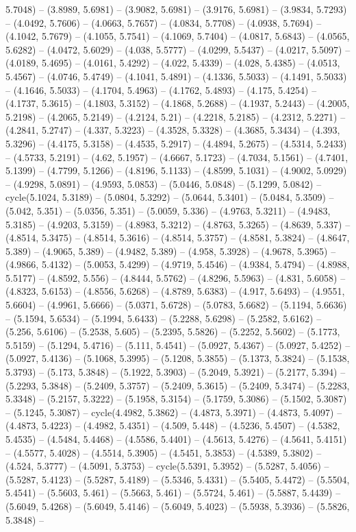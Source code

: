 5.7048) -- (3.8989, 5.6981) -- (3.9082, 5.6981) -- (3.9176, 5.6981) -- (3.9834, 5.7293) -- (4.0492, 5.7606) -- (4.0663, 5.7657) -- (4.0834, 5.7708) -- (4.0938, 5.7694) -- (4.1042, 5.7679) -- (4.1055, 5.7541) -- (4.1069, 5.7404) -- (4.0817, 5.6843) -- (4.0565, 5.6282) -- (4.0472, 5.6029) -- (4.038, 5.5777) -- (4.0299, 5.5437) -- (4.0217, 5.5097) -- (4.0189, 5.4695) -- (4.0161, 5.4292) -- (4.022, 5.4339) -- (4.028, 5.4385) -- (4.0513, 5.4567) -- (4.0746, 5.4749) -- (4.1041, 5.4891) -- (4.1336, 5.5033) -- (4.1491, 5.5033) -- (4.1646, 5.5033) -- (4.1704, 5.4963) -- (4.1762, 5.4893) -- (4.175, 5.4254) -- (4.1737, 5.3615) -- (4.1803, 5.3152) -- (4.1868, 5.2688) -- (4.1937, 5.2443) -- (4.2005, 5.2198) -- (4.2065, 5.2149) -- (4.2124, 5.21) -- (4.2218, 5.2185) -- (4.2312, 5.2271) -- (4.2841, 5.2747) -- (4.337, 5.3223) -- (4.3528, 5.3328) -- (4.3685, 5.3434) -- (4.393, 5.3296) -- (4.4175, 5.3158) -- (4.4535, 5.2917) -- (4.4894, 5.2675) -- (4.5314, 5.2433) -- (4.5733, 5.2191) -- (4.62, 5.1957) -- (4.6667, 5.1723) -- (4.7034, 5.1561) -- (4.7401, 5.1399) -- (4.7799, 5.1266) -- (4.8196, 5.1133) -- (4.8599, 5.1031) -- (4.9002, 5.0929) -- (4.9298, 5.0891) -- (4.9593, 5.0853) -- (5.0446, 5.0848) -- (5.1299, 5.0842) -- cycle(5.1024, 5.3189) -- (5.0804, 5.3292) -- (5.0644, 5.3401) -- (5.0484, 5.3509) -- (5.042, 5.351) -- (5.0356, 5.351) -- (5.0059, 5.336) -- (4.9763, 5.3211) -- (4.9483, 5.3185) -- (4.9203, 5.3159) -- (4.8983, 5.3212) -- (4.8763, 5.3265) -- (4.8639, 5.337) -- (4.8514, 5.3475) -- (4.8514, 5.3616) -- (4.8514, 5.3757) -- (4.8581, 5.3824) -- (4.8647, 5.389) -- (4.9065, 5.389) -- (4.9482, 5.389) -- (4.958, 5.3928) -- (4.9678, 5.3965) -- (4.9866, 5.4132) -- (5.0053, 5.4299) -- (4.9719, 5.4546) -- (4.9384, 5.4794) -- (4.8988, 5.5177) -- (4.8592, 5.556) -- (4.8444, 5.5762) -- (4.8296, 5.5963) -- (4.831, 5.6058) -- (4.8323, 5.6153) -- (4.8556, 5.6268) -- (4.8789, 5.6383) -- (4.917, 5.6493) -- (4.9551, 5.6604) -- (4.9961, 5.6666) -- (5.0371, 5.6728) -- (5.0783, 5.6682) -- (5.1194, 5.6636) -- (5.1594, 5.6534) -- (5.1994, 5.6433) -- (5.2288, 5.6298) -- (5.2582, 5.6162) -- (5.256, 5.6106) -- (5.2538, 5.605) -- (5.2395, 5.5826) -- (5.2252, 5.5602) -- (5.1773, 5.5159) -- (5.1294, 5.4716) -- (5.111, 5.4541) -- (5.0927, 5.4367) -- (5.0927, 5.4252) -- (5.0927, 5.4136) -- (5.1068, 5.3995) -- (5.1208, 5.3855) -- (5.1373, 5.3824) -- (5.1538, 5.3793) -- (5.173, 5.3848) -- (5.1922, 5.3903) -- (5.2049, 5.3921) -- (5.2177, 5.394) -- (5.2293, 5.3848) -- (5.2409, 5.3757) -- (5.2409, 5.3615) -- (5.2409, 5.3474) -- (5.2283, 5.3348) -- (5.2157, 5.3222) -- (5.1958, 5.3154) -- (5.1759, 5.3086) -- (5.1502, 5.3087) -- (5.1245, 5.3087) -- cycle(4.4982, 5.3862) -- (4.4873, 5.3971) -- (4.4873, 5.4097) -- (4.4873, 5.4223) -- (4.4982, 5.4351) -- (4.509, 5.448) -- (4.5236, 5.4507) -- (4.5382, 5.4535) -- (4.5484, 5.4468) -- (4.5586, 5.4401) -- (4.5613, 5.4276) -- (4.5641, 5.4151) -- (4.5577, 5.4028) -- (4.5514, 5.3905) -- (4.5451, 5.3853) -- (4.5389, 5.3802) -- (4.524, 5.3777) -- (4.5091, 5.3753) -- cycle(5.5391, 5.3952) -- (5.5287, 5.4056) -- (5.5287, 5.4123) -- (5.5287, 5.4189) -- (5.5346, 5.4331) -- (5.5405, 5.4472) -- (5.5504, 5.4541) -- (5.5603, 5.461) -- (5.5663, 5.461) -- (5.5724, 5.461) -- (5.5887, 5.4439) -- (5.6049, 5.4268) -- (5.6049, 5.4146) -- (5.6049, 5.4023) -- (5.5938, 5.3936) -- (5.5826, 5.3848) -- 